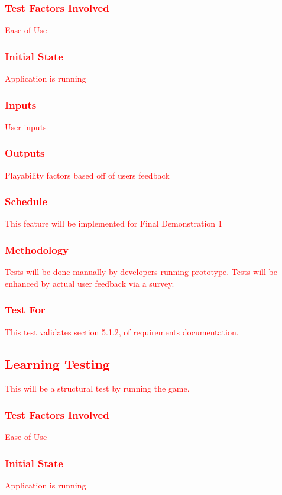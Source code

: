 \documentclass[11pt, oneside]{article}   	%
\begin{document}
\subsubsection{\textcolor{red}{Test Factors Involved}}
\textcolor{red}{Ease of Use}
\subsubsection{\textcolor{red}{Initial State}}
\textcolor{red}{Application is running}
\subsubsection{\textcolor{red}{Inputs}}
\textcolor{red}{User inputs}
\subsubsection{\textcolor{red}{Outputs}}
\textcolor{red}{Playability factors based off of users feedback}
\subsubsection{\textcolor{red}{Schedule}}
\textcolor{red}{This feature will be implemented for Final Demonstration 1}
\subsubsection{\textcolor{red}{Methodology}}
\textcolor{red}{Tests will be done manually by developers running prototype. Tests will be enhanced by actual user feedback via a survey.}
\subsubsection{\textcolor{red}{Test For}}
\textcolor{red}{This test validates section 5.1.2, of requirements documentation.}



\subsection{\textcolor{red}{Learning Testing}}
\textcolor{red}{This will be a structural test by running the game.}
\subsubsection{\textcolor{red}{Test Factors Involved}}
\textcolor{red}{Ease of Use}
\subsubsection{\textcolor{red}{Initial State}}
\textcolor{red}{Application is running}
\end{document}
